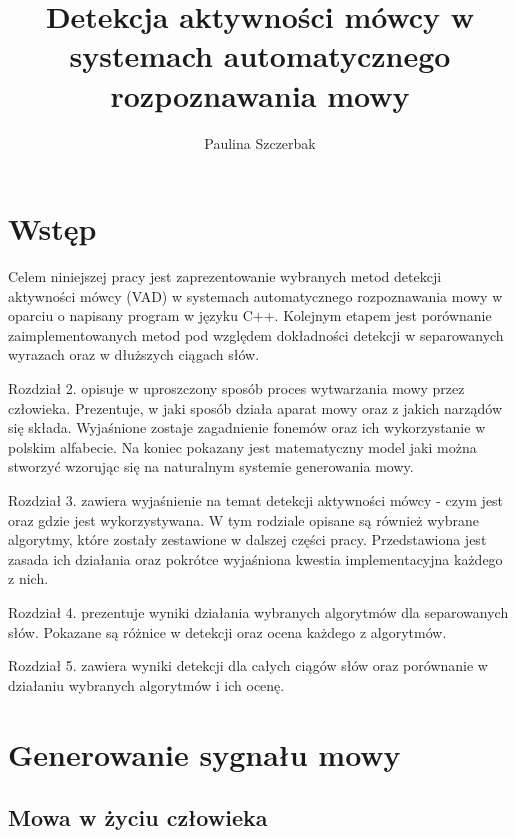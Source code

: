 \documentclass[eng,printmode]{mgr}
\title{Detekcja aktywności mówcy w systemach automatycznego rozpoznawania mowy}
\author{Paulina Szczerbak}
\begin{document}

\maketitle %

\tableofcontents %

\chapter{Wstęp}
Celem niniejszej pracy jest zaprezentowanie wybranych metod detekcji aktywności mówcy (VAD) w systemach automatycznego rozpoznawania mowy w oparciu o napisany program w języku C++. Kolejnym etapem jest porównanie zaimplementowanych metod pod względem dokładności detekcji w separowanych wyrazach oraz w dłuższych ciągach słów.

Rozdział 2. opisuje w uproszczony sposób proces wytwarzania mowy przez człowieka. Prezentuje, w jaki sposób działa aparat mowy oraz z jakich narządów się składa. Wyjaśnione zostaje zagadnienie fonemów oraz ich wykorzystanie w polskim alfabecie. Na koniec pokazany jest matematyczny model jaki można stworzyć wzorując się na naturalnym systemie generowania mowy.

Rozdział 3. zawiera wyjaśnienie na temat detekcji aktywności mówcy - czym jest oraz gdzie jest wykorzystywana. W tym rodziale opisane są również wybrane algorytmy, które zostały zestawione w dalszej części pracy. Przedstawiona jest zasada ich działania oraz pokrótce wyjaśniona kwestia implementacyjna każdego z nich.
 
Rozdział 4. prezentuje wyniki działania wybranych algorytmów dla separowanych słów. Pokazane są różnice w detekcji oraz ocena każdego z algorytmów.

Rozdział 5. zawiera  wyniki detekcji dla całych ciągów słów oraz porównanie w działaniu wybranych algorytmów i ich ocenę.

\chapter{Generowanie sygnału mowy}
 \section{Mowa w życiu człowieka}
 
\end{document}
